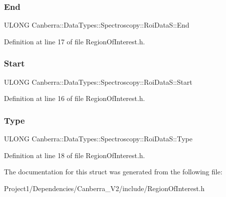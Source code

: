 \subsubsection{\texorpdfstring{End}{End}}
{\footnotesize\ttfamily U\+L\+O\+NG Canberra\+::\+Data\+Types\+::\+Spectroscopy\+::\+Roi\+Data\+S\+::\+End}



Definition at line 17 of file Region\+Of\+Interest.\+h.

\mbox{\label{struct_canberra_1_1_data_types_1_1_spectroscopy_1_1_roi_data_s_a2d54d64ae10d634f6b76768c9d9ad3c9}} 
\subsubsection{\texorpdfstring{Start}{Start}}
{\footnotesize\ttfamily U\+L\+O\+NG Canberra\+::\+Data\+Types\+::\+Spectroscopy\+::\+Roi\+Data\+S\+::\+Start}



Definition at line 16 of file Region\+Of\+Interest.\+h.

\mbox{\label{struct_canberra_1_1_data_types_1_1_spectroscopy_1_1_roi_data_s_a4e5d3f5194205d37aebd490240ae1a1d}} 
\subsubsection{\texorpdfstring{Type}{Type}}
{\footnotesize\ttfamily U\+L\+O\+NG Canberra\+::\+Data\+Types\+::\+Spectroscopy\+::\+Roi\+Data\+S\+::\+Type}



Definition at line 18 of file Region\+Of\+Interest.\+h.



The documentation for this struct was generated from the following file\+:\begin{DoxyCompactItemize}
\item 
Project1/\+Dependencies/\+Canberra\+\_\+\+V2/include/Region\+Of\+Interest.\+h\end{DoxyCompactItemize}
